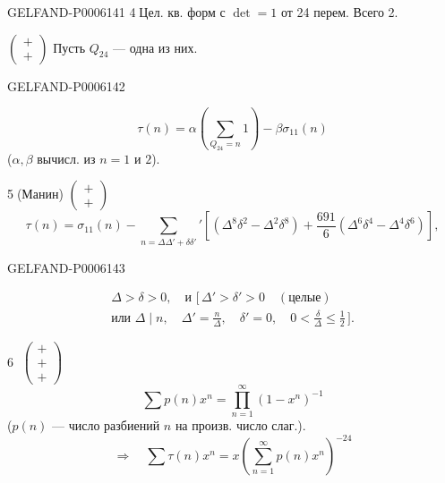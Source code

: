 \begin{GelfandAdjacentEvidence}{GELFAND-P000614}{1}
\textcircled{\scriptsize 4}\quad Цел. кв. форм с \(\det=1\) от 24 перем.
\hfill Всего 2.

\(\left(\begin{smallmatrix}+\\+\end{smallmatrix}\right)\)
\qquad Пусть \(Q_{24}\) — одна из них.
\end{GelfandAdjacentEvidence}
\begin{GelfandAdjacentEvidence}{GELFAND-P000614}{2}

\[
\tau(n)=\alpha\left(\sum_{Q_{24}=n}1\right)-\beta\sigma_{11}(n)
\]
(\(\alpha,\beta\) вычисл. из \(n=1\) и \(2\)).

\textcircled{\scriptsize 5}\quad (Манин)
\hspace{1em}\(\left(\begin{smallmatrix}+\\+\end{smallmatrix}\right)\)
\[
\tau(n)=\sigma_{11}(n)-\sum_{n=\Delta\Delta'+\delta\delta'}'
\left[(\Delta^8\delta^2-\Delta^2\delta^8)
+\frac{691}{6}(\Delta^6\delta^4-\Delta^4\delta^6)\right],
\]
\end{GelfandAdjacentEvidence}
\begin{GelfandAdjacentEvidence}{GELFAND-P000614}{3}

\[
\begin{gathered}
\Delta>\delta>0,\quad\text{и }\bigl[\,\Delta'>\delta'>0\quad(\text{целые})\\
\text{или }\Delta\mid n,\quad \Delta'=\frac n\Delta,\quad
\delta'=0,\quad0<\frac\delta\Delta\le\frac12\,\bigr].
\end{gathered}
\]

\textcircled{\scriptsize 6}\quad
\(\left(\begin{smallmatrix}+\\+\\+\end{smallmatrix}\right)\)
\[
\sum p(n)x^n=\prod_{n=1}^\infty(1-x^n)^{-1}
\]
(\(p(n)\) — число разбиений \(n\) на произв. число слаг.).
\[
\Rightarrow\quad \sum\tau(n)x^n=x\left(\sum_{n=1}^{\infty}p(n)x^n\right)^{-24}
\]
\end{GelfandAdjacentEvidence}
